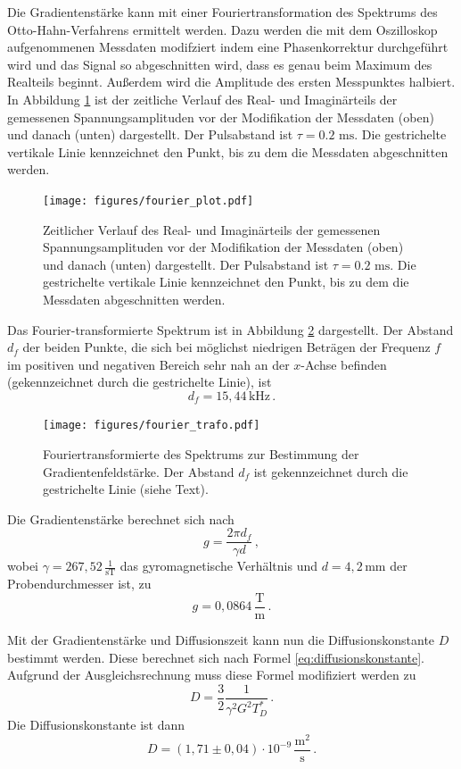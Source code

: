 Die Gradientenstärke kann mit einer Fouriertransformation
des Spektrums des Otto-Hahn-Verfahrens ermittelt werden. 
Dazu werden die mit dem Oszilloskop aufgenommenen Messdaten modifziert indem eine Phasenkorrektur durchgeführt wird und das Signal so 
abgeschnitten wird, dass es genau beim Maximum des Realteils beginnt. Außerdem wird die Amplitude des ersten
Messpunktes halbiert.
In Abbildung \ref{fig:fourier_plot} ist der zeitliche Verlauf des Real- und Imaginärteils der gemessenen 
Spannungsamplituden vor der Modifikation der Messdaten (oben) und danach (unten) dargestellt. 
Der Pulsabstand ist $\tau = 0.2 \text{ ms}$. Die gestrichelte vertikale Linie kennzeichnet den Punkt, bis zu 
dem die Messdaten abgeschnitten werden.
\begin{figure}
    \centering
    \texttt{[image: figures/fourier\_plot.pdf]}
    \caption{Zeitlicher Verlauf des Real- und Imaginärteils der gemessenen 
    Spannungsamplituden vor der Modifikation der Messdaten (oben) und danach (unten) dargestellt. 
    Der Pulsabstand ist $\tau = 0.2 \text{ ms}$. Die gestrichelte vertikale Linie kennzeichnet den Punkt, bis zu 
    dem die Messdaten abgeschnitten werden.}
    \label{fig:fourier_plot}
\end{figure}
Das Fourier-transformierte Spektrum ist in Abbildung \ref{fig:fourier_trafo} dargestellt. Der Abstand $d_f$ der 
beiden Punkte, die sich bei möglichst niedrigen Beträgen der Frequenz $f$ im positiven und negativen Bereich
sehr nah an der $x$-Achse befinden (gekennzeichnet durch die gestrichelte Linie), ist
\begin{equation*}
    d_f = 15,44 \, \text{kHz} \, .
\end{equation*}
\begin{figure}
    \centering
    \texttt{[image: figures/fourier\_trafo.pdf]}
    \caption{Fouriertransformierte des Spektrums zur Bestimmung der Gradientenfeldstärke.
    Der Abstand $d_f$ ist gekennzeichnet durch die gestrichelte Linie (siehe Text).}
    \label{fig:fourier_trafo}
\end{figure}
Die Gradientenstärke berechnet sich nach
\begin{equation*}
    g = \frac{2 \pi d_f}{\gamma d} \, ,
\end{equation*}
wobei $\gamma = 267,52 \, \frac{1}{\text{sT}}$ das gyromagnetische Verhältnis \cite{SciPy} und
$d = 4,2 \, \text{mm}$ der Probendurchmesser ist,
zu 
\begin{equation*}
    g = 0,0864 \, \frac{\text{T}}{\text{m}} \, .
\end{equation*}

Mit der Gradientenstärke und Diffusionszeit kann nun die Diffusionskonstante $D$ bestimmt werden. 
Diese berechnet sich nach Formel \ref{eq:diffusionskonstante}. Aufgrund der Ausgleichsrechnung 
muss diese Formel modifiziert werden zu 
\begin{equation*}
    D = \frac{3}{2} \frac{1}{\gamma^2 G^2 T_D^*} \, .
\end{equation*}
Die Diffusionskonstante ist dann 
\begin{equation*}
    D = (1,71 \pm 0,04) \cdot 10^{-9} \, \frac{\text{m}^2}{\text{s}} \, .
\end{equation*}
